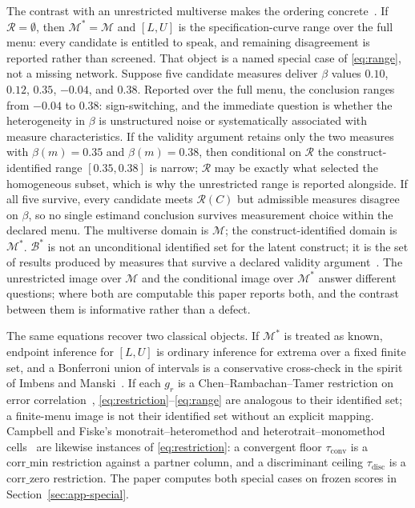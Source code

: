 \documentclass[10pt,letterpaper]{article}
\newcommand{\M}{\ensuremath{\mathcal{M}}}
\newcommand{\Rset}{\mathcal{R}}
\newcommand{\Bset}{\mathcal{B}}
\begin{document}
The contrast with an unrestricted multiverse makes the ordering concrete~\cite{simonsohn2020}.
If $\Rset=\emptyset$, then $\M^*=\M$ and $[L,U]$ is the specification-curve range over the full menu: every candidate is entitled to speak, and remaining disagreement is reported rather than screened.
That object is a named special case of \eqref{eq:range}, not a missing network.
Suppose five candidate measures deliver $\beta$ values $0.10$, $0.12$, $0.35$, $-0.04$, and $0.38$.
Reported over the full menu, the conclusion ranges from $-0.04$ to $0.38$: sign-switching, and the immediate question is whether the heterogeneity in $\beta$ is unstructured noise or systematically associated with measure characteristics.
If the validity argument retains only the two measures with $\beta(m)=0.35$ and $\beta(m)=0.38$, then conditional on $\Rset$ the construct-identified range $[0.35,0.38]$ is narrow; $\Rset$ may be exactly what selected the homogeneous subset, which is why the unrestricted range is reported alongside.
If all five survive, every candidate meets $\Rset(C)$ but admissible measures disagree on $\beta$, so no single estimand conclusion survives measurement choice within the declared menu.
The multiverse domain is $\M$; the construct-identified domain is $\M^*$.
$\Bset^*$ is not an unconditional identified set for the latent construct; it is the set of results produced by measures that survive a declared validity argument~\cite{manski2003,molinari2020}.
The unrestricted image over $\M$ and the conditional image over $\M^*$ answer different questions; where both are computable this paper reports both, and the contrast between them is informative rather than a defect.

The same equations recover two classical objects.
If $\M^*$ is treated as known, endpoint inference for $[L,U]$ is ordinary inference for extrema over a fixed finite set, and a Bonferroni union of intervals is a conservative cross-check in the spirit of Imbens and Manski~\cite{imbensmanski2004}.
If each $g_r$ is a Chen--Rambachan--Tamer restriction on error correlation~\cite{chenrttamer2026}, \eqref{eq:restriction}--\eqref{eq:range} are analogous to their identified set; a finite-menu image is not their identified set without an explicit mapping.
Campbell and Fiske's monotrait--heteromethod and heterotrait--monomethod cells~\cite{campbell1959} are likewise instances of \eqref{eq:restriction}: a convergent floor $\tau_{\mathrm{conv}}$ is a $\mathrm{corr\_min}$ restriction against a partner column, and a discriminant ceiling $\tau_{\mathrm{disc}}$ is a $\mathrm{corr\_zero}$ restriction.
The paper computes both special cases on frozen scores in Section~\ref{sec:app-special}.
\end{document}

